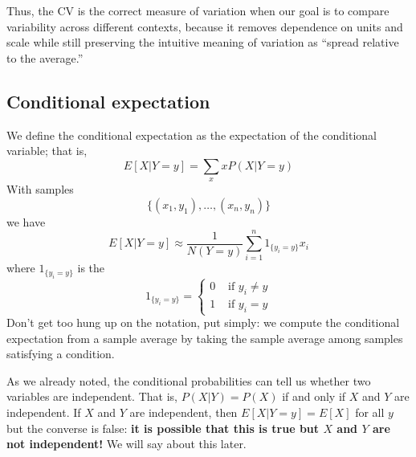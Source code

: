 Thus, the CV is the correct measure of variation when our goal is to compare variability across different contexts, because it removes dependence on units and scale while still preserving the intuitive meaning of variation as ``spread relative to the average.''  





\subsection{Conditional expectation}

 We define the conditional expectation  \cite[Definition 3.5.1]{evans} as the expectation of the conditional variable; that is, 
\begin{equation*}
E[X|Y=y] = \sum_{x} xP(X|Y=y)
\end{equation*}
With samples
\begin{equation*}
\{(x_1,y_1),\dots,(x_n,y_n)\}
\end{equation*}
we have 
 \begin{equation*}
E[X|Y=y] \approx  \frac{1}{N(Y=y)}\sum_{i=1}^n1_{\{y_i = y\}}x_i
 \end{equation*}
 where $1_{\{y_i = y\}}$ is the 
 \begin{equation*}
 1_{\{y_i = y\}} = \left\{ \begin{array}{cc}
 0 & \text{ if } y_i\ne y\\
  1 & \text{ if } y_i=y
  \end{array}\right.
 \end{equation*}
Don't get too hung up on the notation, put simply: we compute the conditional expectation from a sample average by taking the sample average among samples satisfying a condition. 

 As we already noted, the conditional probabilities can tell us whether two variables are independent. That is, $P(X|Y) = P(X)$ if and only if $X$ and $Y$ are independent. If $X$ and $Y$ are independent, then $E[X|Y=y]= E[X]$ for all $y$ but the converse is false: {\bf it is possible that this is true but $X$ and $Y$ are not independent!} We will say about this later.  




